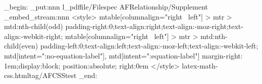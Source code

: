 

\ExplSyntaxOn
\group_begin:
\pdfdict_put:nnn {l_pdffile/Filespec} {AFRelationship}{/Supplement}
\pdffile_embed_stream:nnn{
<style>
mtable[columnalign="right ~left"] > mtr > mtd:nth-child(odd) {
padding-right:0;text-align:right;text-align:-moz-right;text-align:-webkit-right;
}
mtable[columnalign="right ~left"] > mtr > mtd:nth-child(even) {
padding-left:0;text-align:left;text-align:-moz-left;text-align:-webkit-left;
}
mtd[intent=":no-equation-label"], mtd[intent=":equation-label"] {
margin-right: 1em;display:block; position:absolute; right:0em
}
</style>
}{latex-math-css.html}{tag/AFCSStest}
\group_end:
\ExplSyntaxOff



